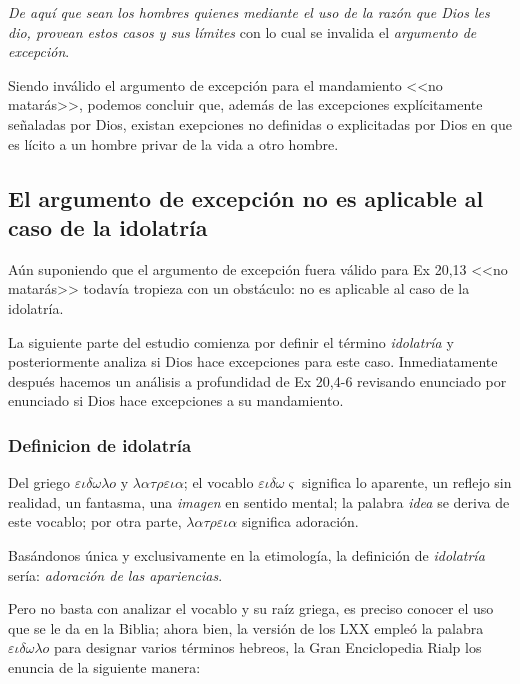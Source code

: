 \documentclass{article}
\begin{document}
\noindent
\emph{De aqu\'{i} que sean los hombres quienes mediante el uso de la raz\'on que Dios les dio, provean estos casos y sus l\'{i}mites} con lo cual se invalida el \emph{argumento de excepci\'on}.

Siendo inv\'alido el argumento de excepci\'on para el mandamiento <<no matar\'as>>, podemos concluir que, adem\'as de las excepciones expl\'{i}citamente se\~naladas por Dios, existan exepciones no definidas o explicitadas por Dios en que es l\'{i}cito a un hombre privar de la vida a otro hombre.

\subsection{El argumento de excepci\'on no es aplicable al caso de la idolatr\'{i}a}

A\'un suponiendo que el argumento de excepci\'on fuera v\'alido para Ex 20,13 <<no matar\'as>> todav\'ia tropieza con un obst\'aculo: no es aplicable al caso de la idolatr\'{i}a.

La siguiente parte del estudio comienza por definir el t\'ermino \emph{idolatr\'{i}a} y posteriormente analiza si Dios hace excepciones para este caso. Inmediatamente despu\'es hacemos un an\'alisis a profundidad de Ex 20,4-6 revisando enunciado por enunciado si Dios hace excepciones a su mandamiento.

\subsubsection{Definicion de idolatr\'{i}a}

Del griego $\varepsilon\iota\delta\omega\lambda o$ y $\lambda\alpha\tau\rho\varepsilon\iota\alpha$; el vocablo $\varepsilon\iota\delta\omega\varsigma$ significa lo aparente, un reflejo sin realidad, un fantasma, una \emph{imagen} en sentido mental; la palabra \emph{idea} se deriva de este vocablo; por otra parte, $\lambda\alpha\tau\rho\varepsilon\iota\alpha$ significa adoraci\'on.

Bas\'andonos \'unica y exclusivamente en la etimolog\'{i}a, la definici\'on de \emph{idolatr\'{i}a} ser\'{i}a: \emph{adoraci\'on de las apariencias}.

Pero no basta con analizar el vocablo y su ra\'{i}z griega, es preciso conocer el uso que se le da en la Biblia; ahora bien, la versi\'on de los LXX emple\'o la palabra $\varepsilon\iota\delta\omega\lambda o$ para designar varios t\'erminos hebreos, la Gran Enciclopedia Rialp los enuncia de la siguiente manera:
\end{document}
